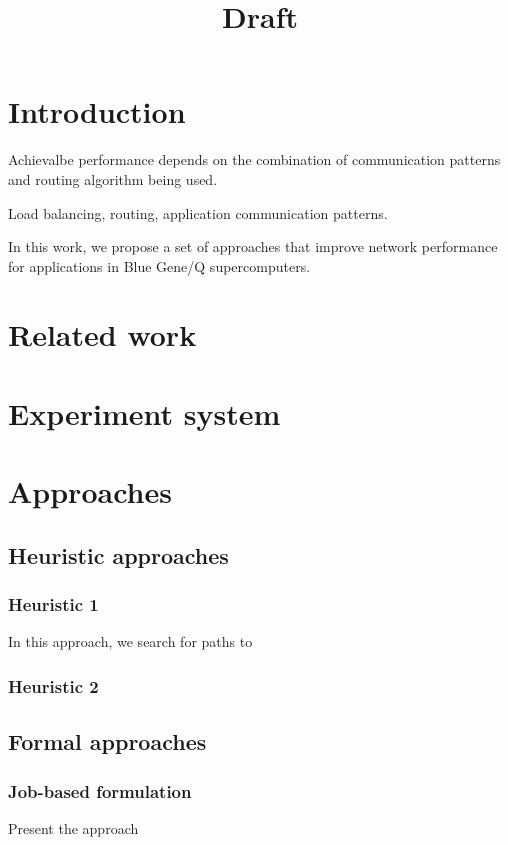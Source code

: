 \documentclass[letter]{article}
\title{Draft}
\begin{document}
\maketitle

\section{Introduction}
Achievalbe performance depends on the combination of communication patterns and routing algorithm being used.

Load balancing, routing, application communication patterns.

In this work, we propose a set of approaches that improve network performance for applications in Blue Gene/Q supercomputers. 

\section{Related work}

\section{Experiment system}

\section{Approaches}

\subsection{Heuristic approaches}

\subsubsection{Heuristic 1}
In this approach, we search for paths to 

\subsubsection{Heuristic 2}

\subsection{Formal approaches}

\subsubsection{Job-based formulation}
Present the approach
\end{document}
